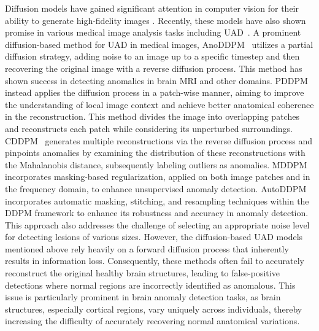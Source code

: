 Diffusion models have gained significant attention in computer vision for their ability to generate high-fidelity images \cite{croitoru2023diffusion}. Recently, these models have also shown promise in various medical image analysis tasks including UAD~\cite{behrendt2023patched,iqbal2023unsupervised,behrendt2024leveraging,bercea2024diffusion,liang2024itermask2,naval_marimont2024disyre,naval2024ensembled,wyatt2022anoddpm}. A prominent diffusion-based method for UAD in medical images,  
AnoDDPM~\cite{wyatt2022anoddpm} utilizes a partial diffusion strategy, adding noise to an image up to a specific timestep and then recovering the original image with a reverse diffusion process. This method has shown success in detecting anomalies in brain MRI and other domains.   PDDPM~\cite{behrendt2023patched} instead applies the diffusion process in a patch-wise manner, aiming to improve the understanding of local image context and achieve better anatomical coherence in the reconstruction. This method divides the image into overlapping patches and reconstructs each patch while considering its unperturbed surroundings. CDDPM~\cite{behrendt2024leveraging} generates multiple reconstructions via the reverse diffusion process and pinpoints anomalies by examining the distribution of these reconstructions with the Mahalanobis distance, subsequently labeling outliers as anomalies. MDDPM\cite{iqbal2023unsupervised} incorporates masking-based regularization, applied on both image patches and in the frequency domain, to enhance unsupervised anomaly detection. AutoDDPM \cite{bercea2023mask} incorporates automatic masking, stitching, and resampling techniques within the DDPM framework to enhance its robustness and accuracy in anomaly detection. This approach also addresses the challenge of selecting an appropriate noise level for detecting lesions of various sizes. However, the diffusion-based UAD models mentioned above rely heavily on a forward diffusion process that inherently results in information loss. Consequently, these methods often fail to accurately reconstruct the original healthy brain structures, leading to false-positive detections where normal regions are incorrectly identified as anomalous. This issue is particularly prominent in brain anomaly detection tasks, as brain structures, especially cortical regions, vary uniquely across individuals, thereby increasing the difficulty of accurately recovering normal anatomical variations.

